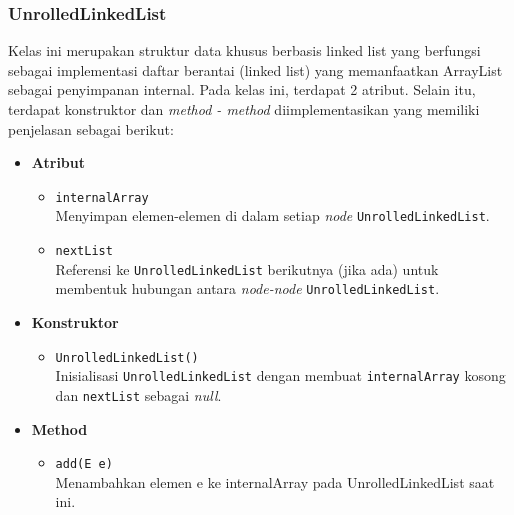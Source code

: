 \subsubsection{UnrolledLinkedList}
Kelas ini merupakan struktur data khusus berbasis linked list yang berfungsi sebagai implementasi daftar berantai (linked list) yang memanfaatkan ArrayList sebagai penyimpanan internal. Pada kelas ini, terdapat 2 atribut. Selain itu, terdapat konstruktor dan \textit{method - method} diimplementasikan yang memiliki penjelasan sebagai berikut:
\newpage
\begin{itemize}
    \item \textbf{Atribut}
    \begin{itemize}
        \item \texttt{internalArray}
        \\ Menyimpan elemen-elemen di dalam setiap \textit{node} \texttt{UnrolledLinkedList}.
        \item \texttt{nextList}
        \\ Referensi ke \texttt{UnrolledLinkedList} berikutnya (jika ada) untuk membentuk hubungan antara \textit{node-node} \texttt{UnrolledLinkedList}.
    \end{itemize}

    \item \textbf{Konstruktor}
    \begin{itemize}
        \item \texttt{UnrolledLinkedList()}
        \\ Inisialisasi \texttt{UnrolledLinkedList} dengan membuat \texttt{internalArray} kosong dan \texttt{nextList} sebagai \textit{null}.
    \end{itemize}

    \item \textbf{Method}
    \begin{itemize}
        \item \texttt{add(E e)}
        \\Menambahkan elemen e ke internalArray pada UnrolledLinkedList saat ini.


\end{itemize}
\end{itemize}
